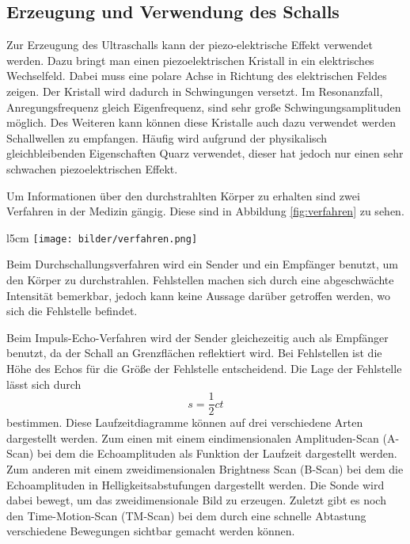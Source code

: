 \subsection{Erzeugung und Verwendung des Schalls}
Zur Erzeugung des Ultraschalls kann der piezo-elektrische Effekt verwendet werden.
Dazu bringt man einen piezoelektrischen Kristall in ein elektrisches Wechselfeld.
Dabei muss eine polare Achse in Richtung des elektrischen Feldes zeigen. Der Kristall
wird dadurch in Schwingungen versetzt. Im Resonanzfall, Anregungsfrequenz gleich
Eigenfrequenz, sind sehr große Schwingungsamplituden möglich.
Des Weiteren kann können diese Kristalle auch dazu verwendet werden Schallwellen zu
empfangen. Häufig wird aufgrund der physikalisch gleichbleibenden Eigenschaften
Quarz verwendet, dieser hat jedoch nur einen sehr schwachen piezoelektrischen
Effekt.

Um Informationen über den durchstrahlten Körper zu erhalten sind zwei Verfahren in
der Medizin gängig. Diese sind in Abbildung \ref{fig:verfahren} zu sehen.
\begin{wrapfigure}{l}{5cm}
  \centering
  \texttt{[image: bilder/verfahren.png]}
  \caption{Durchschallungs- und Impuls-Echo-Verfahren \cite{us2}}
  \label{fig:verfahren}
\end{wrapfigure}
Beim Durchschallungsverfahren wird ein Sender und ein Empfänger benutzt, um den
Körper zu durchstrahlen. Fehlstellen machen sich durch eine abgeschwächte
Intensität bemerkbar, jedoch kann keine Aussage darüber getroffen werden, wo
sich die Fehlstelle befindet.

Beim Impuls-Echo-Verfahren wird der Sender gleichezeitig auch als Empfänger benutzt,
da der Schall an Grenzflächen reflektiert wird. Bei Fehlstellen ist die Höhe des
Echos für die Größe der Fehlstelle entscheidend. Die Lage der Fehlstelle lässt sich
durch
\begin{equation}
  s = \frac{1}{2} c t
\end{equation}
bestimmen. Diese Laufzeitdiagramme können auf drei verschiedene Arten dargestellt werden.
Zum einen mit einem eindimensionalen Amplituden-Scan (A-Scan) bei dem die Echoamplituden als Funktion
der Laufzeit dargestellt werden. Zum anderen mit einem zweidimensionalen Brightness
Scan (B-Scan) bei dem die Echoamplituden in Helligkeitsabstufungen dargestellt werden.
Die Sonde wird dabei bewegt, um das zweidimensionale Bild zu erzeugen.
Zuletzt gibt es noch den Time-Motion-Scan (TM-Scan) bei dem durch eine schnelle Abtastung
verschiedene Bewegungen sichtbar gemacht werden können.
